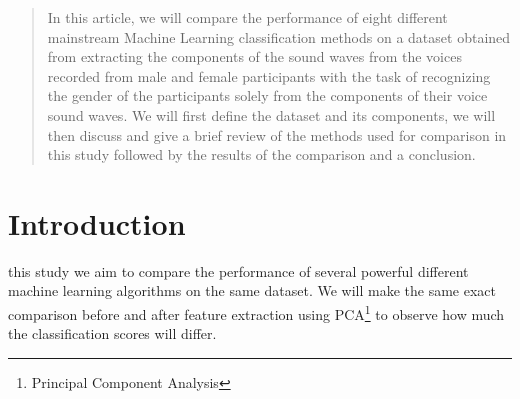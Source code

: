 \documentclass[journal,onecolumn]{IEEEtran}
\begin{document}







\maketitle

\begin{abstract}
In this article, we will compare the performance of eight different mainstream
Machine Learning classification methods on a dataset obtained from
extracting the components of the sound waves from the voices recorded from
male and female participants with the task of recognizing the gender of the
participants solely from the components of their voice sound waves. We will first define 
the dataset and its components, we will then discuss 
and give a brief review of the methods used for comparison in this study followed by 
the results of the comparison and a conclusion.
\end{abstract}


%
\IEEEpeerreviewmaketitle



\section{Introduction}
% 
% 
% 
% 
 this study we aim to compare the performance of several powerful different
machine learning algorithms on the same dataset. We will make the same exact comparison before and
after feature extraction using PCA\footnote{Principal Component Analysis} to observe how much the 
classification scores will differ.
\end{document}
